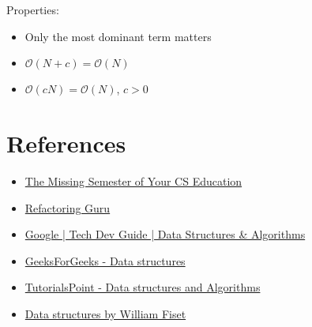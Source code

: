 Properties:
\begin{itemize}
	\item Only the most dominant term matters
	\item $ \mathcal{O}(N + c) = \mathcal{O}(N) $
	\item $ \mathcal{O}(cN) = \mathcal{O}(N) $, $ c > 0 $
\end{itemize}

\section{References}

\begin{itemize}
	\item \href{https://missing.csail.mit.edu/}{The Missing Semester of Your CS Education}
	\item \href{https://refactoring.guru/design-patterns/}{Refactoring Guru}
	\item \href{https://techdevguide.withgoogle.com/paths/data-structures-and-algorithms/}{Google | Tech Dev Guide | Data Structures \& Algorithms}
	\item \href{https://www.geeksforgeeks.org/data-structures/}{GeeksForGeeks - Data structures}
	\item \href{https://www.tutorialspoint.com/data_structures_algorithms/index.htm}{TutorialsPoint - Data structures and Algorithms}
	\item \href{https://youtube.com/playlist?list=PLDV1Zeh2NRsB6SWUrDFW2RmDotAfPbeHu}{Data structures by William Fiset}
\end{itemize}